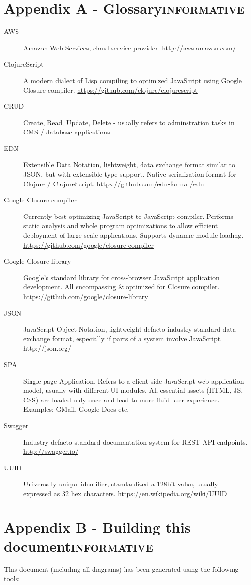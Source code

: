 \documentclass[letterpaper, 9pt, onecolumn, twoside, technote, final]{IEEEtran}
\begin{document}
\section[Appendix A - Glossary]{Appendix A - Glossary\hfill{}\textsc{informative}}
\label{sec:org101d683}
\begin{description}
\item[{AWS}] Amazon Web Services, cloud service provider.
\url{http://aws.amazon.com/}
\item[{ClojureScript}] A modern dialect of Lisp compiling to optimized
JavaScript using Google Closure compiler. \url{https://github.com/clojure/clojurescript}
\item[{CRUD}] Create, Read, Update, Delete - usually refers to
adminstration tasks in CMS / database applications
\item[{EDN}] Extensible Data Notation, lightweight, data exchange format
similar to JSON, but with extensible type support. Native
serialization format for Clojure / ClojureScript.
\url{https://github.com/edn-format/edn}
\item[{Google Closure compiler}] Currently best optimizing JavaScript to
JavaScript compiler. Performs static analysis and whole program
optimizations to allow efficient deployment of large-scale
applications. Supports dynamic module loading.
\url{https://github.com/google/closure-compiler}
\item[{Google Closure library}] Google's standard library for
cross-browser JavaScript application development. All
encompassing \& optimized for Closure compiler.
\url{https://github.com/google/closure-library}
\item[{JSON}] JavaScript Object Notation, lightweight defacto industry
standard data exchange format, especially if parts of a system
involve JavaScript. \url{http://json.org/}
\item[{SPA}] Single-page Application. Refers to a client-side JavaScript
web application model, usually with different UI modules. All
essential assets (HTML, JS, CSS) are loaded only once and lead to
more fluid user experience. Examples: GMail, Google Docs etc.
\item[{Swagger}] Industry defacto standard documentation system for REST
API endpoints. \url{http://swagger.io/}
\item[{UUID}] Universally unique identifier, standardized a 128bit value,
usually expressed as 32 hex characters. \url{https://en.wikipedia.org/wiki/UUID}
\end{description}
\section[Appendix B - Building this document]{Appendix B - Building this document\hfill{}\textsc{informative}}
\label{sec:orgf273336}
This document (including all diagrams) has been generated using the
following tools:
\end{document}
